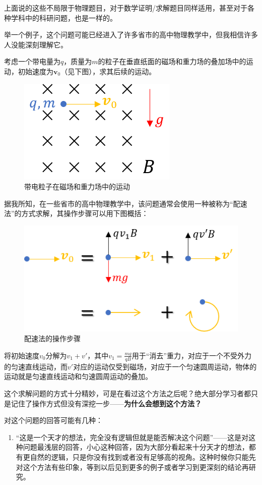 \documentclass{ctexart}
\begin{document}
上面说的这些不局限于物理题目，对于数学证明/求解题目同样适用，甚至对于各种学科中的科研问题，也是一样的。

\begin{myexample}
  举一个例子，这个问题可能已经进入了许多省市的高中物理教学中，但我相信许多人没能深刻理解它。  
  
  考虑一个带电量为$q$，质量为$m$的粒子在垂直纸面的磁场和重力场的叠加场中的运动，初始速度为$\mathbf{v}_{0}$（见下图），求其后续的运动。
  
  \begin{figure}[H]
    \centering
    \includegraphics[width=.3\linewidth]{fig/配速.png}
    \caption{带电粒子在磁场和重力场中的运动}
    \label{fig:particle_motion}
  \end{figure}
  
  据我所知，在一些省市的高中物理教学中，该问题通常会使用一种被称为“配速法”的方式求解，其操作步骤可以用下图概括：
  
  \begin{figure}[H]
    \centering
    \includegraphics[width=.4\linewidth]{fig/配速运动.png}
    \caption{配速法的操作步骤}
    \label{fig:method}
  \end{figure}
  
  将初始速度$v_{0}$分解为$v_{1} + v'$，其中$v_{1} = \frac{mg}{qB}$用于“消去”重力，对应于一个不受外力的匀速直线运动，而$v'$对应的运动仅受到磁场，对应于一个匀速圆周运动，物体的运动就是匀速直线运动和匀速圆周运动的叠加。
  
  这个求解问题的方式十分精妙，可是在看过这个方法之后呢？绝大部分学习者都只是记住了操作方式但没有深挖一步——\textbf{为什么会想到这个方法？}
  
  对这个问题的回答可能有几种：
  
  \begin{enumerate}[leftmargin=*, labelsep=0.5em]
    \item “这是一个天才的想法，完全没有逻辑但就是能否解决这个问题”——这是对这种问题最浅层的回答，小心这种回答，因为大部分看起来十分天才的想法，都有更自然的逻辑，只是你没有找到或者没有足够高的视角。这种时候你只能先对这个方法有些印象，等到以后见到更多的例子或者学习到更深刻的结论再研究。
    

\end{enumerate}
\end{myexample}
\end{document}
